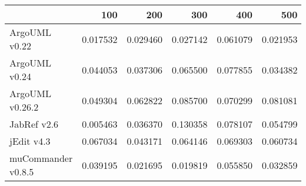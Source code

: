 \begin{tabular}{lrrrrr}
\toprule
{} &       100 &       200 &       300 &       400 &       500 \\
\midrule
ArgoUML v0.22      &  0.017532 &  0.029460 &  0.027142 &  0.061079 &  0.021953 \\
ArgoUML v0.24      &  0.044053 &  0.037306 &  0.065500 &  0.077855 &  0.034382 \\
ArgoUML v0.26.2    &  0.049304 &  0.062822 &  0.085700 &  0.070299 &  0.081081 \\
JabRef v2.6        &  0.005463 &  0.036370 &  0.130358 &  0.078107 &  0.054799 \\
jEdit v4.3         &  0.067034 &  0.043171 &  0.064146 &  0.069303 &  0.060734 \\
muCommander v0.8.5 &  0.039195 &  0.021695 &  0.019819 &  0.055850 &  0.032859 \\
\bottomrule
\end{tabular}
